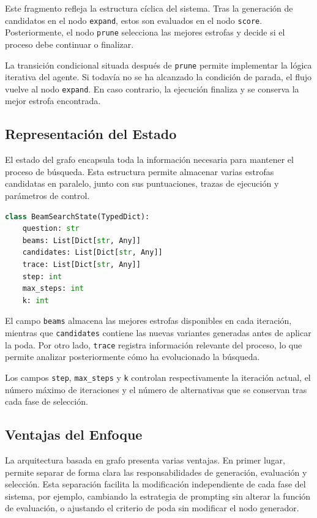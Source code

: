 \documentclass[12pt,a4paper,twoside,openright]{book}
\begin{document}
Este fragmento refleja la estructura cíclica del sistema. Tras la generación de candidatos en el nodo \texttt{expand}, estos son evaluados en el nodo \texttt{score}. Posteriormente, el nodo \texttt{prune} selecciona las mejores estrofas y decide si el proceso debe continuar o finalizar.

La transición condicional situada después de \texttt{prune} permite implementar la lógica iterativa del agente. Si todavía no se ha alcanzado la condición de parada, el flujo vuelve al nodo \texttt{expand}. En caso contrario, la ejecución finaliza y se conserva la mejor estrofa encontrada.



\subsection{Representación del Estado}

El estado del grafo encapsula toda la información necesaria para mantener el proceso de búsqueda. Esta estructura permite almacenar varias estrofas candidatas en paralelo, junto con sus puntuaciones, trazas de ejecución y parámetros de control.

\begin{lstlisting}[language=Python, caption={Estructura del estado del grafo}]
class BeamSearchState(TypedDict):
    question: str
    beams: List[Dict[str, Any]]
    candidates: List[Dict[str, Any]]
    trace: List[Dict[str, Any]]
    step: int
    max_steps: int
    k: int
\end{lstlisting}

El campo \texttt{beams} almacena las mejores estrofas disponibles en cada iteración, mientras que \texttt{candidates} contiene las nuevas variantes generadas antes de aplicar la poda. Por otro lado, \texttt{trace} registra información relevante del proceso, lo que permite analizar posteriormente cómo ha evolucionado la búsqueda.

Los campos \texttt{step}, \texttt{max\_steps} y \texttt{k} controlan respectivamente la iteración actual, el número máximo de iteraciones y el número de alternativas que se conservan tras cada fase de selección.

\subsection{Ventajas del Enfoque}

La arquitectura basada en grafo presenta varias ventajas. En primer lugar, permite separar de forma clara las responsabilidades de generación, evaluación y selección. Esta separación facilita la modificación independiente de cada fase del sistema, por ejemplo, cambiando la estrategia de prompting sin alterar la función de evaluación,
o ajustando el criterio de poda sin modificar el nodo generador.
\end{document}
